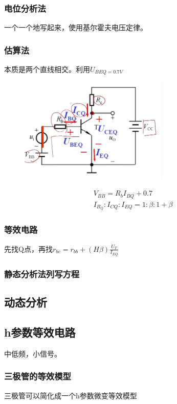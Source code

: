 \subsubsection{电位分析法}
一个一个地写起来，使用基尔霍夫电压定律。
\subsubsection{估算法}
本质是两个直线相交。利用$U_{BEQ=0.7V}$
        \begin{figure}[H]
            \centering
            \includegraphics[width=7cm]{img/2.8.png}
            \end{figure}
\begin{align}
    V_{BB}=R_bI_{BQ}+0.7 \tag{3.2.a} \\
    I_{B_Q}:I_{CQ}:I_{EQ}=1:\beta:1+\beta\tag{3.2.b}
\end{align}

\subsubsection{等效电路}
先找Q点，再找$\displaystyle r_{be}=r_{bb}+(H\beta)\frac{U_T}{I_{EQ}}$

\subsubsection{静态分析法列写方程}

\subsection{动态分析}
\subsection{h参数等效电路}
中低频，小信号。
\subsubsection{三极管的等效模型}
三极管可以简化成一个h参数微变等效模型

